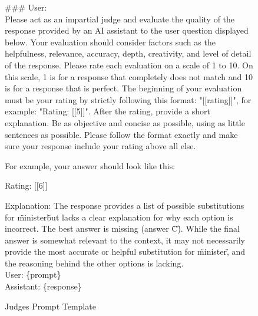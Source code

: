 \documentclass{brandeis-thesis3.2}
\theoremstyle{plain}
\theoremstyle{definition}
\theoremstyle{remark}
\numberwithin{equation}{section}
\begin{document}
\begin{figure}[h!]
\centering
\begin{tcolorbox}[promptbox]

\#\#\# User:\\
[System] Please act as an impartial judge and evaluate the quality of the response provided by an AI assistant to the user question displayed below. Your evaluation should consider factors such as the helpfulness, relevance, accuracy, depth, creativity, and level of detail of the response. Please rate each evaluation on a scale of 1 to 10. On this scale, 1 is for a response that completely does not match and 10 is for a response that is perfect. The beginning of your evaluation must be your rating by strictly following this format: "[[rating]]", for example: "Rating: [[5]]". After the rating, provide a short explanation. Be as objective and concise as possible, using as little sentences as possible. Please follow the format exactly and make sure your response include your rating above all else.

For example, your answer should look like this: 

Rating: [[6]]

Explanation: The response provides a list of possible substitutions for \"minister\" but lacks a clear explanation for why each option is incorrect. The best answer is missing (answer \"C\"). While the final answer is somewhat relevant to the context, it may not necessarily provide the most accurate or helpful substitution for \"minister\", and the reasoning behind the other options is lacking.\\

User: \{prompt\}\\

Assistant: \{response\}
\end{tcolorbox}
\label{fig:judge}
\caption{Judges Prompt Template}
\end{figure}
\end{document}
